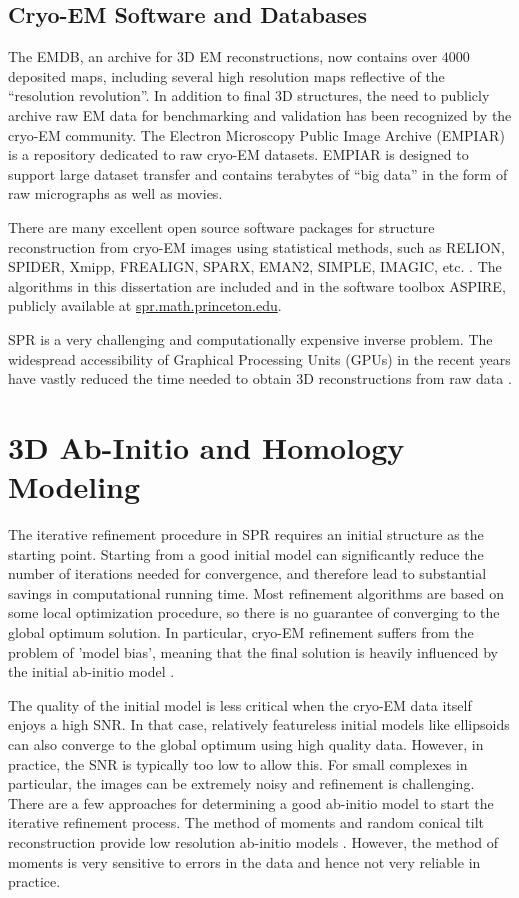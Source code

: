 \subsection{Cryo-EM Software and Databases}
The EMDB, an archive for 3D EM reconstructions, now contains over $4000$ deposited maps, including several high resolution maps reflective of the ``resolution revolution''. In addition to final 3D structures, the need to publicly archive raw EM data for benchmarking and validation has been recognized by the cryo-EM community. The Electron Microscopy Public Image Archive (EMPIAR) is a repository dedicated to raw cryo-EM datasets. EMPIAR is designed to support large dataset transfer and contains terabytes of ``big data'' in the form of raw micrographs as well as movies.

There are many excellent open source software packages for structure reconstruction from cryo-EM images using statistical methods, such as RELION, SPIDER, Xmipp, FREALIGN, SPARX, EMAN2, SIMPLE, IMAGIC, etc. \cite{eman2, xmipp, spider, imagic, relion, frealign}. The algorithms in this dissertation are included and in the software toolbox ASPIRE, publicly available at \url{spr.math.princeton.edu}. 

SPR is a very challenging and computationally expensive inverse problem. The widespread accessibility of Graphical Processing Units (GPUs) in the recent years have vastly reduced the time needed to obtain 3D reconstructions from raw data \cite{gpurelion}.


\section{3D Ab-Initio and Homology Modeling}
The iterative refinement procedure in SPR requires an initial structure as the starting point. Starting from a good initial model can significantly reduce the number of iterations needed for convergence, and therefore lead to substantial savings in computational running time. Most refinement algorithms are based on some local optimization procedure, so there is no guarantee of converging to the global optimum solution. In particular, cryo-EM refinement suffers from the problem of 'model bias', meaning that the final solution is heavily influenced by the initial ab-initio model \cite{sigworth_rev}.

The quality of the initial model is less critical when the cryo-EM data itself enjoys a high SNR. In that case, relatively featureless initial models like ellipsoids can also converge to the global optimum using high quality data. However, in practice, the SNR is typically too low to allow this. For small complexes in particular, the images can be extremely noisy and refinement is challenging. There are a few approaches for determining a good ab-initio model to start the iterative refinement process. The method of moments and random conical tilt reconstruction provide low resolution ab-initio models \cite{Radermacher, Radermacher2, Salzman1990, Goncharov1986, Goncharov1988} . However, the method of moments is very sensitive to errors in the data and hence not very reliable in practice.

